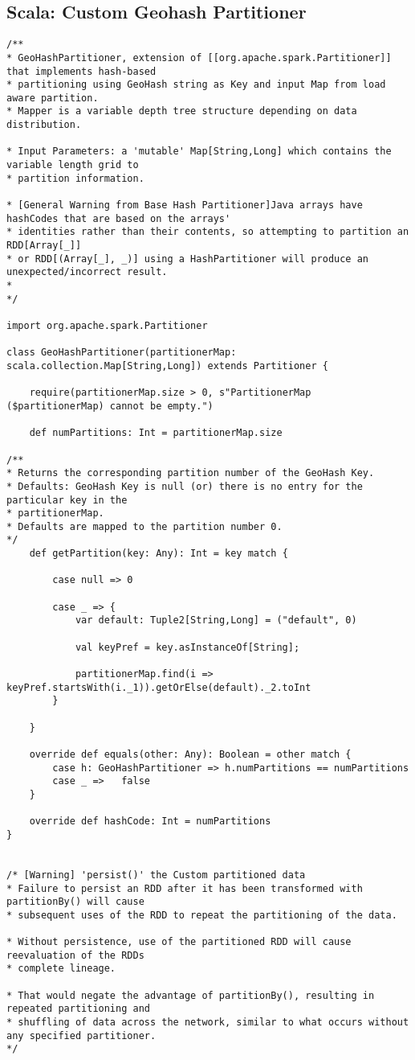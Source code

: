 \documentclass[article,type=msc,colorback,12pt,accentcolor=tud1d]{tudthesis}
\begin{document}
			\subsection{Scala: Custom Geohash Partitioner}
\begin{lstlisting}
/**
* GeoHashPartitioner, extension of [[org.apache.spark.Partitioner]] that implements hash-based 
* partitioning using GeoHash string as Key and input Map from load aware partition.
* Mapper is a variable depth tree structure depending on data distribution. 

* Input Parameters: a 'mutable' Map[String,Long] which contains the variable length grid to 
* partition information. 

* [General Warning from Base Hash Partitioner]Java arrays have hashCodes that are based on the arrays'
* identities rather than their contents, so attempting to partition an RDD[Array[_]] 
* or RDD[(Array[_], _)] using a HashPartitioner will produce an unexpected/incorrect result.
* 
*/

import org.apache.spark.Partitioner

class GeoHashPartitioner(partitionerMap: scala.collection.Map[String,Long]) extends Partitioner {

	require(partitionerMap.size > 0, s"PartitionerMap ($partitionerMap) cannot be empty.")

	def numPartitions: Int = partitionerMap.size
	
/**
* Returns the corresponding partition number of the GeoHash Key. 
* Defaults: GeoHash Key is null (or) there is no entry for the particular key in the 
* partitionerMap. 
* Defaults are mapped to the partition number 0. 
*/
	def getPartition(key: Any): Int = key match {
		
		case null => 0
		
		case _ => {
			var default: Tuple2[String,Long] = ("default", 0)
			
			val keyPref = key.asInstanceOf[String];
			
			partitionerMap.find(i => keyPref.startsWith(i._1)).getOrElse(default)._2.toInt
		}
	
	}
	
	override def equals(other: Any): Boolean = other match {
		case h: GeoHashPartitioner => h.numPartitions == numPartitions
		case _ => 	false
	}
	
	override def hashCode: Int = numPartitions
}


/* [Warning] 'persist()' the Custom partitioned data
* Failure to persist an RDD after it has been transformed with partitionBy() will cause 
* subsequent uses of the RDD to repeat the partitioning of the data. 

* Without persistence, use of the partitioned RDD will cause reevaluation of the RDDs 
* complete lineage. 

* That would negate the advantage of partitionBy(), resulting in repeated partitioning and 
* shuffling of data across the network, similar to what occurs without any specified partitioner.
*/
\end{lstlisting}
			
\end{document}
